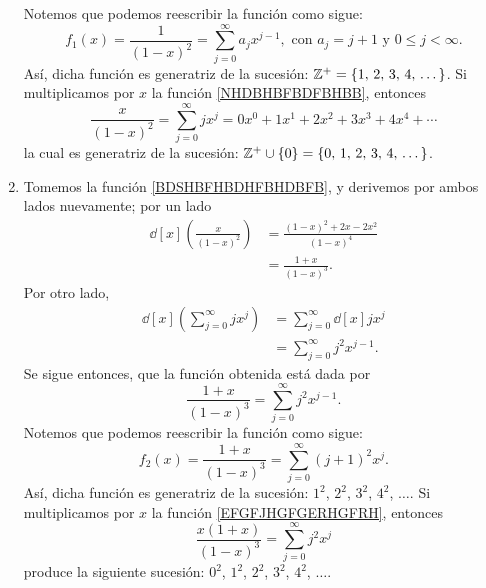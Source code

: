 \begin{myexample}
\begin{enumerate}[label=\alph*)]
\begin{equation}
        \end{equation}
        Notemos que podemos reescribir la función como sigue:
        $$f_1(x) = \frac{1}{(1-x)^{2}} = \sum_{j=0}^{\infty} a_j x^{j-1}, \text{ con } a_j = j+1 \text{ y } 0 \leq j < \infty.$$
        Así, dicha función es generatriz de la sucesión: $\ZZ[+] = \left\{ 1, \, 2, \, 3, \, 4, \, \dots \right\}$. Si multiplicamos por $x$ la función \eqref{NHDBHBFBDFBHBB}, entonces
        \begin{equation}
            \frac{x}{(1-x)^{2}} = \sum_{j=0}^{\infty} jx^{j} = 0x^{0} + 1x^{1} + 2x^{2} + 3x^{3} + 4x^{4} + \cdots \label{BDSHBFHBDHFBHDBFB}
        \end{equation}
        la cual es generatriz de la sucesión: $\ZZ[+] \cup \{0\}= \left\{0, \,  1, \, 2, \, 3, \, 4, \, \dots \right\}$.
        \item Tomemos la función \eqref{BDSHBFHBDHFBHDBFB}, y derivemos por ambos lados nuevamente; por un lado
        \begin{align*}
            \dd[x] \left( \frac{x}{(1-x)^{2}} \right) & = \frac{(1-x)^{2}+2x-2x^{2}}{(1-x)^{4}} \\
            & = \frac{1+x}{(1-x)^{3}}.
        \end{align*}
        Por otro lado,
        \begin{align*}
            \dd[x] \left( \sum_{j=0}^{\infty} jx^{j} \right) & = \sum_{j=0}^{\infty} \dd[x] jx^{j} \\
            & = \sum_{j=0}^{\infty} j^{2} x^{j-1}.
        \end{align*}
        Se sigue entonces, que la función obtenida está dada por
        \begin{equation}
            \frac{1+x}{(1-x)^{3}} = \sum_{j=0}^{\infty} j^{2} x^{j-1}. \label{EFGFJHGFGERHGFRH}
        \end{equation}
        Notemos que podemos reescribir la función como sigue:
        $$f_2(x) = \frac{1+x}{(1-x)^{3}} = \sum_{j=0}^{\infty} (j+1)^{2} x^{j}.$$
        Así, dicha función es generatriz de la sucesión: $1^{2}$, $2^{2}$, $3^{2}$, $4^{2}$, $\dots$. Si multiplicamos por $x$ la función \eqref{EFGFJHGFGERHGFRH}, entonces
        $$\frac{x(1+x)}{(1-x)^{3}} = \sum_{j=0}^{\infty} j^{2} x^{j}$$
        produce la siguiente sucesión: $0^{2}$, $1^{2}$, $2^{2}$, $3^{2}$, $4^{2}$, $\dots$.
    \end{enumerate}
\end{myexample}

